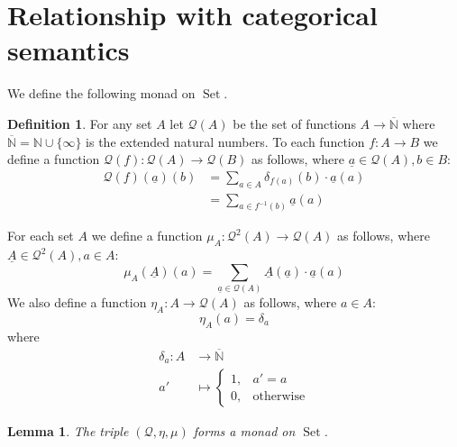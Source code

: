 \documentclass[12pt]{article}
\theoremstyle{plain}
\newtheorem{lemma}[thm]{Lemma}
\theoremstyle{definition}
\newtheorem{defn}[thm]{Definition} %
\newcommand{\bb}[1]{\mathbb{#1}}
\newcommand{\call}[1]{\mathcal{#1}}
\newcommand{\lto}{\longrightarrow}
\DeclareMathOperator{\set}{Set}
\begin{document}
\section{Relationship with categorical semantics}
We define the following monad on $\set$.
\begin{defn}
	For any set $A$ let $\call{Q}(A)$ be the set of functions $A \lto \overline{\bb{N}}$ where $\overline{\bb{N}} = \bb{N} \cup \{ \infty \}$ is the extended natural numbers. To each function $f: A \lto B$ we define a function $\call{Q}(f): \call{Q}(A) \lto \call{Q}(B)$ as follows, where $\underline{a} \in \call{Q}(A), b \in B$:
	\begin{align*}
		\call{Q}(f)(\underline{a})(b) &= \sum_{a \in A} \delta_{f(a)}(b) \cdot \underline{a}(a)\\
		&= \sum_{a \in f^{-1}(b)}\underline{a}(a)
	\end{align*}

	For each set $A$ we define a function $\mu_A: \call{Q}^2(A) \lto \call{Q}(A)$ as follows, where $\underline{A} \in \call{Q}^2(A), a \in A$:
	\begin{equation}
		\mu_A(\underline{A})(a) = \sum_{\underline{a} \in \call{Q}(A)}\underline{A}(\underline{a})\cdot \underline{a}(a)
	\end{equation}
	We also define a function $\eta_A: A \lto \call{Q}(A)$ as follows, where $a \in A$:
	\begin{equation}
		\eta_A(a) = \delta_a
	\end{equation}
	where
	\begin{align*}
		\delta_a: A &\lto \overline{\bb{N}}\\
					a' &\longmapsto
					\begin{cases}
						1,& a' = a\\
						0,& \text{otherwise}
					\end{cases}
	\end{align*}
\end{defn}
\begin{lemma}
	The triple $(\call{Q}, \eta, \mu)$ forms a monad on $\set$. 
\end{lemma}
\end{document}
